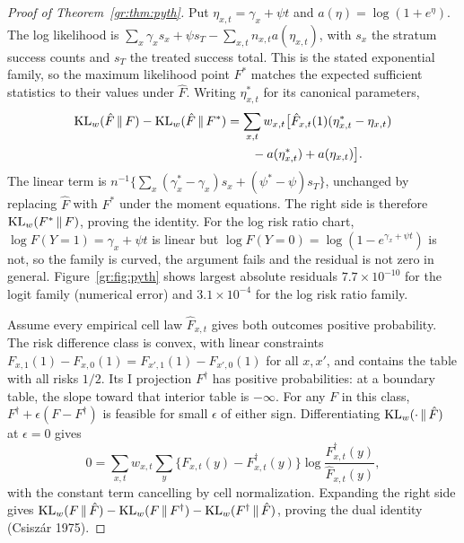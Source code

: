 \begin{proof}[Proof of Theorem~\ref{gr:thm:pyth}]
Put $\eta_{x,t}=\gamma_x+\psi t$ and $a(\eta)=\log(1+e^\eta)$. The log likelihood is $\sum_x\gamma_xs_x+\psi s_T-\sum_{x,t}n_{x,t}a(\eta_{x,t})$, with $s_x$ the stratum success counts and $s_T$ the treated success total. This is the stated exponential family, so the maximum likelihood point $F^*$ matches the expected sufficient statistics to their values under $\hat F$. Writing $\eta^*_{x,t}$ for its canonical parameters,
\begin{align*}
\mathrm{KL}_w(\hat F\,\|\,F)-\mathrm{KL}_w(\hat F\,\|\,F^*)&=\sum_{x,t}w_{x,t}\bigl[\hat F_{x,t}(1)(\eta^*_{x,t}-\eta_{x,t})\\
&\qquad-a(\eta^*_{x,t})+a(\eta_{x,t})\bigr].
\end{align*}
The linear term is $n^{-1}\{\sum_x(\gamma_x^*-\gamma_x)s_x+(\psi^*-\psi)s_T\}$, unchanged by replacing $\hat F$ with $F^*$ under the moment equations. The right side is therefore $\mathrm{KL}_w(F^*\,\|\,F)$, proving the identity. For the log risk ratio chart, $\log F(Y=1)=\gamma_x+\psi t$ is linear but $\log F(Y=0)=\log(1-e^{\gamma_x+\psi t})$ is not, so the family is curved, the argument fails and the residual is not zero in general. Figure~\ref{gr:fig:pyth} shows largest absolute residuals $7.7\times10^{-10}$ for the logit family (numerical error) and $3.1\times10^{-4}$ for the log risk ratio family.

Assume every empirical cell law $\hat F_{x,t}$ gives both outcomes positive probability. The risk difference class is convex, with linear constraints $F_{x,1}(1)-F_{x,0}(1)=F_{x',1}(1)-F_{x',0}(1)$ for all $x,x'$, and contains the table with all risks $1/2$. Its I projection $F^\dagger$ has positive probabilities: at a boundary table, the slope toward that interior table is $-\infty$. For any $F$ in this class, $F^\dagger+\epsilon(F-F^\dagger)$ is feasible for small $\epsilon$ of either sign. Differentiating $\mathrm{KL}_w(\cdot\,\|\,\hat F)$ at $\epsilon=0$ gives
\[
0=\sum_{x,t}w_{x,t}\sum_y\{F_{x,t}(y)-F^\dagger_{x,t}(y)\}\log\frac{F^\dagger_{x,t}(y)}{\hat F_{x,t}(y)},
\]
with the constant term cancelling by cell normalization. Expanding the right side gives $\mathrm{KL}_w(F\,\|\,\hat F)-\mathrm{KL}_w(F\,\|\,F^\dagger)-\mathrm{KL}_w(F^\dagger\,\|\,\hat F)$, proving the dual identity (Csisz\'ar 1975).
\end{proof}

